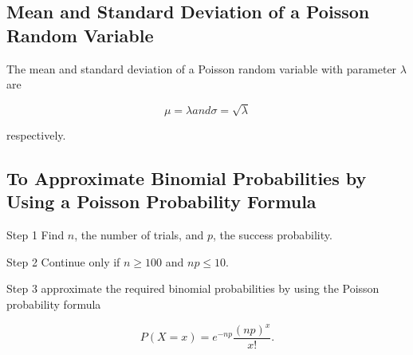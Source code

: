 \documentclass[12pt]{article}
\begin{document}
        \subsection*{Mean and Standard Deviation of a Poisson Random Variable}
            The mean and standard deviation of a Poisson random variable with parameter $\lambda$ are
            \begin{center}
                \[
                    \mu = \lambda and \sigma = \sqrt{\lambda}    
                \]                
            \end{center}
            respectively.
        \subsection*{To Approximate Binomial Probabilities by Using a Poisson Probability Formula}
            \begin{description}
                \item {Step 1} Find $n$, the number of trials, and $p$, the success probability.
                \item {Step 2} Continue only if $n \geq 100$ and $np \leq 10$.
                \item {Step 3} approximate the required binomial probabilities by using the Poisson
                probability formula
                \begin{center}
                    \[
                        P(X = x) = e^{-np}\frac{(np)^x}{x!}.   
                    \]                    
                \end{center}
            \end{description}
\end{document}
